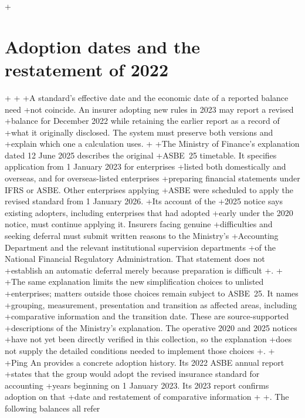 +\section{Adoption dates and the restatement of 2022}
+\label{sec:insurance-adoption}
+
+A standard's effective date and the economic date of a reported balance need
+not coincide. An insurer adopting new rules in 2023 may report a revised
+balance for December 2022 while retaining the earlier report as a record of
+what it originally disclosed. The system must preserve both versions and
+explain which one a calculation uses.
+
+The Ministry of Finance's explanation dated 12 June 2025 describes the original
+ASBE~25 timetable. It specifies application from 1 January 2023 for enterprises
+listed both domestically and overseas, and for overseas-listed enterprises
+preparing financial statements under IFRS or ASBE. Other enterprises applying
+ASBE were scheduled to apply the revised standard from 1 January 2026.
+Its account of the
+2025 notice says existing adopters, including enterprises that had adopted
+early under the 2020 notice, must continue applying it. Insurers facing genuine
+difficulties and seeking deferral must submit written reasons to the Ministry's
+Accounting Department and the relevant institutional supervision departments
+of the National Financial Regulatory Administration. That statement does not
+establish an automatic deferral merely because preparation is difficult
+\citep[answers on background and implementation arrangements]{mofinsurance2025qa}.
+
+The same explanation limits the new simplification choices to unlisted
+enterprises; matters outside those choices remain subject to ASBE~25. It names
+grouping, measurement, presentation and transition as affected areas, including
+comparative information and the transition date. These are source-supported
+descriptions of the Ministry's explanation. The operative 2020 and 2025 notices
+have not yet been directly verified in this collection, so the explanation
+does not supply the detailed conditions needed to implement those choices
+\citep[answer on the relationship between the notice and the standard]{mofinsurance2025qa}.
+
+Ping An provides a concrete adoption history. Its 2022 ASBE annual report
+states that the group would adopt the revised insurance standard for accounting
+years beginning on 1 January 2023. Its 2023 report confirms adoption on that
+date and restatement of comparative information
+\citep[Note XIV.2, pp.~315--316]{pingan2022asbe}
+\citep[Note IV.34, p.~192]{pingan2023asbe}. The following balances all refer

